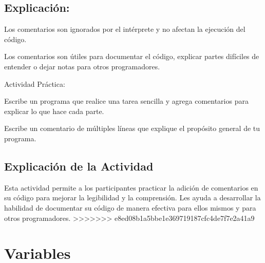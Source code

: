 \documentclass[
  a4paper,
  onepage,
  openany]{scrreprt}
\begin{document}
\hypertarget{explicaciuxf3n-9}{%
\section{Explicación:}\label{explicaciuxf3n-9}}

Los comentarios son ignorados por el intérprete y no afectan la
ejecución del código.

Los comentarios son útiles para documentar el código, explicar partes
difíciles de entender o dejar notas para otros programadores.

\begin{tcolorbox}[enhanced jigsaw, breakable, opacityback=0, toptitle=1mm, coltitle=black, toprule=.15mm, rightrule=.15mm, colframe=quarto-callout-important-color-frame, opacitybacktitle=0.6, arc=.35mm, title=\textcolor{quarto-callout-important-color}{\faExclamation}\hspace{0.5em}{Importante}, titlerule=0mm, colbacktitle=quarto-callout-important-color!10!white, bottomtitle=1mm, bottomrule=.15mm, colback=white, left=2mm, leftrule=.75mm]

Actividad Práctica:

Escribe un programa que realice una tarea sencilla y agrega comentarios
para explicar lo que hace cada parte.

Escribe un comentario de múltiples líneas que explique el propósito
general de tu programa.

\end{tcolorbox}

\hypertarget{explicaciuxf3n-de-la-actividad-7}{%
\section{Explicación de la
Actividad}\label{explicaciuxf3n-de-la-actividad-7}}

Esta actividad permite a los participantes practicar la adición de
comentarios en su código para mejorar la legibilidad y la comprensión.
Les ayuda a desarrollar la habilidad de documentar su código de manera
efectiva para ellos mismos y para otros programadores.
\textgreater\textgreater\textgreater\textgreater\textgreater\textgreater\textgreater{}
e8ed08b1a5bbe1e369719187cfc4de7f7e2a41a9

\hypertarget{variables-2}{%
\chapter{Variables}\label{variables-2}}
\end{document}
